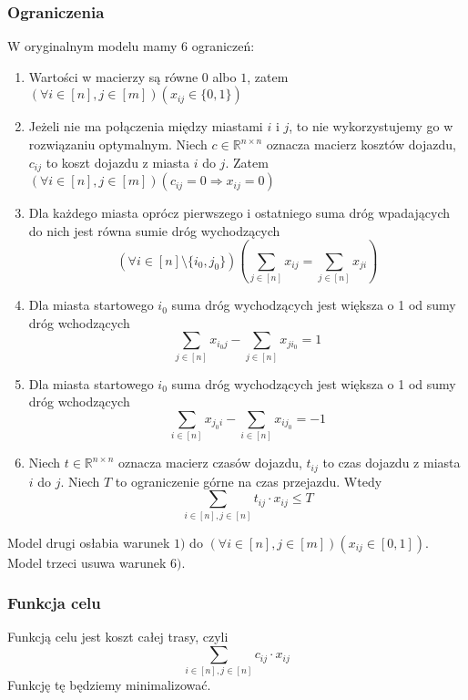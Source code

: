 \documentclass{article}
\begin{document}
\subsubsection{Ograniczenia}
W oryginalnym modelu mamy 6 ograniczeń:
\begin{enumerate}[1)]
\item Wartości w macierzy są równe $0$ albo $1$, zatem $(\forall i\in [n], j\in[m])(x_{ij} \in \{0,1\})$
\item Jeżeli nie ma połączenia między miastami $i$ i $j$, to nie wykorzystujemy go w rozwiązaniu optymalnym. Niech $c\in\mathbb{R}^{n\times n}$ oznacza macierz kosztów dojazdu, $c_{ij}$ to koszt dojazdu z miasta $i$ do $j$. Zatem $(\forall i\in [n], j\in[m])(c_{ij} = 0 \Rightarrow x_{ij} = 0)$
\item Dla każdego miasta oprócz pierwszego i ostatniego suma dróg wpadających do  nich jest równa sumie dróg wychodzących
$$(\forall i\in [n]\setminus\{i_0,j_0\})\left(\sum_{j\in[n]}x_{ij} = \sum_{j\in[n]} x_{ji}\right)$$ 
\item Dla miasta startowego $i_0$ suma dróg wychodzących jest większa o 1 od sumy dróg wchodzących
$$\sum_{j\in[n]}x_{i_0j} - \sum_{j\in[n]} x_{ji_0} = 1$$ 

\item Dla miasta startowego $i_0$ suma dróg wychodzących jest większa o 1 od sumy dróg wchodzących
$$\sum_{i\in[n]}x_{j_0 i} - \sum_{i\in[n]} x_{ij_0} = -1$$ 

\item Niech $t\in\mathbb{R}^{n\times n}$ oznacza macierz czasów dojazdu, $t_{ij}$ to czas dojazdu z miasta $i$ do $j$.  Niech $T$ to ograniczenie górne na czas przejazdu. Wtedy
$$\sum_{i\in[n],j\in[n]} t_{ij} \cdot x_{ij} \leq T$$


\end{enumerate}
Model drugi osłabia warunek $1)$ do $(\forall i\in [n], j\in[m])(x_{ij} \in [0,1])$. Model trzeci usuwa warunek $6)$.

\subsubsection{Funkcja celu}
Funkcją celu jest koszt całej trasy, czyli
$$\sum_{i\in[n],j\in[n]} c_{ij} \cdot x_{ij}$$
Funkcję tę będziemy minimalizować.
\end{document}
